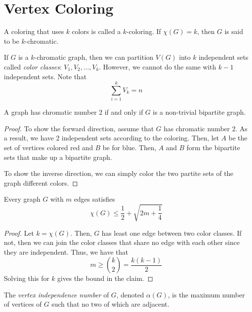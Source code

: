 \section{Vertex Coloring}

\begin{definition}
  A coloring that uses \(k\) colors is called a \(k\)-coloring.
  If \(\chi(G)=k\), then \(G\) is said to be \(k\)-chromatic.
\end{definition}

If \(G\) is a \(k\)-chromatic graph, then we can partition 
\(V(G)\) into \(k\) independent sets called \textit{color
classes}: \(V_1, V_2, \ldots, V_k\). However, we cannot do the
same with \(k-1\) independent sets. Note that
\[ \sum_{i=1}^k V_k = n \]

\begin{theorem}
  A graph has chromatic number 2 if and only if \(G\) is a
  non-trivial bipartite graph.
\end{theorem}

\begin{proof}
  To show the forward direction, assume that \(G\) has chromatic
  number 2. As a result, we have 2 independent sets according to
  the coloring. Then, let \(A\) be the set of vertices colored
  red and \(B\) be for blue. Then, \(A\) and \(B\) form the
  bipartite sets that make up a bipartite graph.

  To show the inverse direction, we can simply color the two
  partite sets of the graph different colors.
\end{proof}

\begin{theorem}
  Every graph \(G\) with \(m\) edges satisfies
  \[ \chi(G) \leq \frac{1}{2}+\sqrt{2 m+\frac{1}{4}} \]
\end{theorem}

\begin{proof}
  Let \(k = \chi(G)\). Then, \(G\) has least one edge between two
  color classes. If not, then we can join the color classes that
  share no edge with each other since they are independent.
  Thus, we have that
  \[ m \geq \binom{k}{2} = \frac{k(k-1)}{2} \]
  Solving this for \(k\) gives the bound in the claim.
\end{proof}

\begin{definition}
  The \textit{vertex independence number} of \(G\), denoted
  \(\alpha(G)\), is the maximum number of vertices of \(G\) such
  that no two of which are adjacent.
\end{definition}

